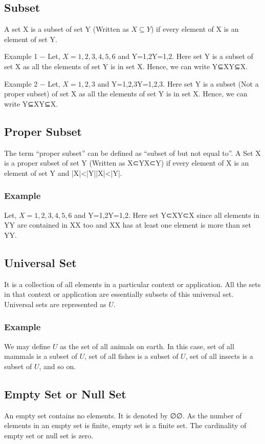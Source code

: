 \documentclass[12pt]{article}
\begin{document}
\subsection{Subset}
A set X is a subset of set Y (Written as $X \subseteq Y$) if every element of X is an element of set Y.

Example 1 − Let, $X={1,2,3,4,5,6}$ and Y={1,2}Y={1,2}. Here set Y is a subset of set X as all the elements of set Y is in set X. Hence, we can write Y⊆XY⊆X.

Example 2 − Let, $X={1,2,3}$ and Y={1,2,3}Y={1,2,3}. Here set Y is a subset (Not a proper subset) of set X as all the elements of set Y is in set X. Hence, we can write Y⊆XY⊆X.

\subsection{Proper Subset}
The term “proper subset” can be defined as “subset of but not equal to”. A Set X is a proper subset of set Y (Written as X⊂YX⊂Y) if every element of X is an element of set Y and |X|<|Y||X|<|Y|.

\subsubsection{Example} Let, $X={1,2,3,4,5,6}$ and Y={1,2}Y={1,2}. Here set Y⊂XY⊂X since all elements in YY are contained in XX too and XX has at least one element is more than set YY.

\subsection{Universal Set}
It is a collection of all elements in a particular context or application. All the sets in that context or application are essentially subsets of this universal set. Universal sets are represented as $U$.

\subsubsection{Example} We may define $U$ as the set of all animals on earth. In this case, set of all mammals is a subset of $U$, set of all fishes is a subset of $U$, set of all insects is a subset of $U$, and so on.

\subsection{Empty Set or Null Set}
An empty set contains no elements. It is denoted by ∅∅. As the number of elements in an empty set is finite, empty set is a finite set. The cardinality of empty set or null set is zero.
\end{document}

